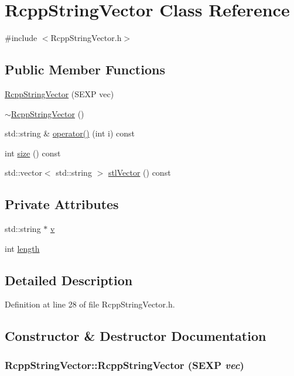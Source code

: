 \hypertarget{classRcppStringVector}{
\section{RcppStringVector Class Reference}
\label{classRcppStringVector}
}


{\ttfamily \#include $<$RcppStringVector.h$>$}\subsection*{Public Member Functions}
\begin{DoxyCompactItemize}
\item 
\hyperlink{classRcppStringVector_af0216e26ab72efb7a6b07182224f84c5}{RcppStringVector} (SEXP vec)
\item 
\hyperlink{classRcppStringVector_a1b0550e206ac6945b00ee02c3c4bf373}{$\sim$RcppStringVector} ()
\item 
std::string \& \hyperlink{classRcppStringVector_ab735b7a963eed91b60dbb3c6a4fc0d72}{operator()} (int i) const 
\item 
int \hyperlink{classRcppStringVector_ada1580e213b9bcde60397bffd7607ae0}{size} () const 
\item 
std::vector$<$ std::string $>$ \hyperlink{classRcppStringVector_a2cd7003720e2900b1c53ffe47205bc75}{stlVector} () const 
\end{DoxyCompactItemize}
\subsection*{Private Attributes}
\begin{DoxyCompactItemize}
\item 
std::string $\ast$ \hyperlink{classRcppStringVector_a94d14fa5093cc8219cbcb91aadfed09e}{v}
\item 
int \hyperlink{classRcppStringVector_aaa2e2e4335d14e46fc96b07836e99573}{length}
\end{DoxyCompactItemize}


\subsection{Detailed Description}


Definition at line 28 of file RcppStringVector.h.

\subsection{Constructor \& Destructor Documentation}
\hypertarget{classRcppStringVector_af0216e26ab72efb7a6b07182224f84c5}{
\subsubsection[{RcppStringVector}]{\setlength{\rightskip}{0pt plus 5cm}RcppStringVector::RcppStringVector (SEXP {\em vec})}}
\label{classRcppStringVector_af0216e26ab72efb7a6b07182224f84c5}


